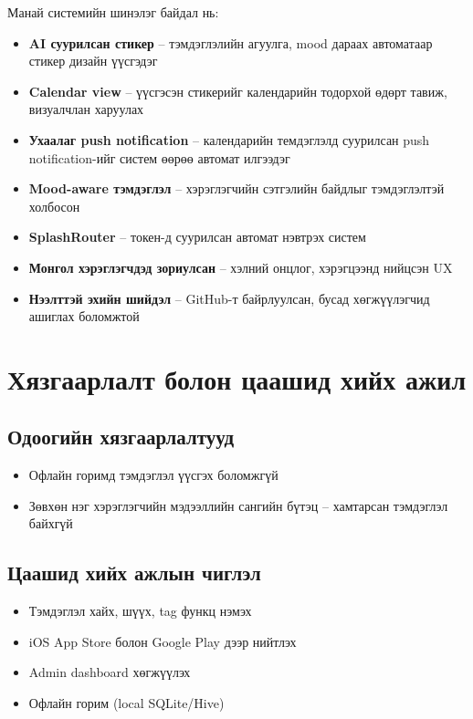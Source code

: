 Манай системийн шинэлэг байдал нь:
\begin{itemize}  \item \textbf{AI суурилсан стикер} -- тэмдэглэлийн агуулга, mood дараах автоматаар стикер дизайн үүсгэдэг
  \item \textbf{Calendar view} -- үүсгэсэн стикерийг календарийн тодорхой өдөрт тавиж, визуалчлан харуулах
  \item \textbf{Ухаалаг push notification} -- календарийн темдэглэлд суурилсан push notification-ийг систем өөрөө автомат илгээдэг  \item \textbf{Mood-aware тэмдэглэл} -- хэрэглэгчийн сэтгэлийн байдлыг тэмдэглэлтэй холбосон
  \item \textbf{SplashRouter} -- токен-д суурилсан автомат нэвтрэх систем
  \item \textbf{Монгол хэрэглэгчдэд зориулсан} -- хэлний онцлог, хэрэгцээнд нийцсэн UX
  \item \textbf{Нээлттэй эхийн шийдэл} -- GitHub-т байрлуулсан, бусад хөгжүүлэгчид ашиглах боломжтой
\end{itemize}

\section{Хязгаарлалт болон цаашид хийх ажил}

\subsection{Одоогийн хязгаарлалтууд}

\begin{itemize}

  \item Офлайн горимд тэмдэглэл үүсгэх боломжгүй
  \item Зөвхөн нэг хэрэглэгчийн мэдээллийн сангийн бүтэц -- хамтарсан тэмдэглэл байхгүй
\end{itemize}

\subsection{Цаашид хийх ажлын чиглэл}

\begin{itemize}
  \item Тэмдэглэл хайх, шүүх, tag функц нэмэх
  \item iOS App Store болон Google Play дээр нийтлэх
  \item Admin dashboard хөгжүүлэх
  \item Офлайн горим (local SQLite/Hive)
\end{itemize}

